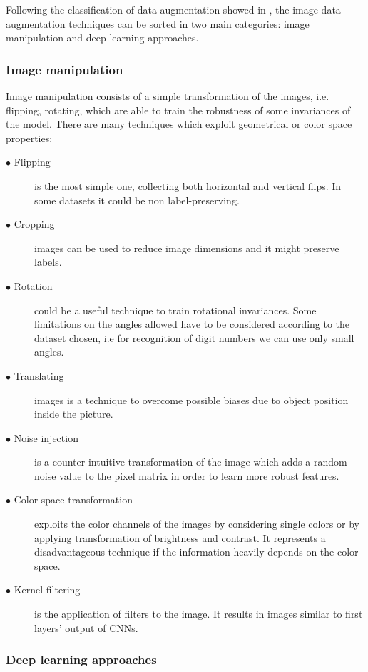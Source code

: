 \documentclass[../main.tex]{subfiles}
\begin{document}
Following the classification of data augmentation showed in \cite{shorten2019survey-data-augmentation}, the image data augmentation techniques can be sorted in two main categories: image manipulation and deep learning approaches.

\subsubsection{Image manipulation}

Image manipulation consists of a simple transformation of the images, i.e. flipping, rotating, which are able to train the robustness of some invariances of the model. There are many techniques which exploit geometrical or color space properties:

\begin{description}
\item[$\bullet$ Flipping] is the most simple one, collecting both horizontal and vertical flips. In some datasets it could be non label-preserving.
\item[$\bullet$ Cropping] images can be used to reduce image dimensions and it might preserve labels.
\item[$\bullet$ Rotation] could be a useful technique to train rotational invariances.
Some limitations on the angles allowed have to be considered according to the dataset chosen, i.e for recognition of digit numbers we can use only small angles.
\item[$\bullet$ Translating] images is a technique to overcome possible biases due to object position inside the picture.
\item[$\bullet$ Noise injection] is a counter intuitive transformation of the image which adds a random noise value to the pixel matrix in order to learn more robust features.
\item[$\bullet$ Color space transformation] exploits the color channels of the images by considering single colors or by applying transformation of brightness and contrast. It represents a disadvantageous technique if the information heavily depends on the color space.
\item[$\bullet$ Kernel filtering] is the application of filters to the image. It results in images similar to first layers' output of CNNs.
\end{description}

\subsubsection{Deep learning approaches}
\end{document}
